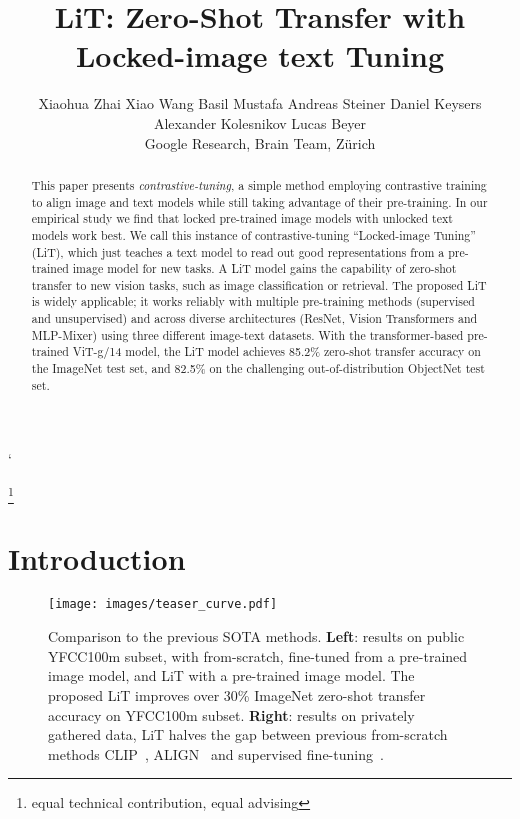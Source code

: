 \documentclass[10pt,twocolumn,letterpaper]{article}
\def \flame {\raisebox{-.1\height}{\texttt{[image: images/Noto\_Emoji\_Pie\_1f525.pdf]}}\xspace}
\def \litf {LiT\flame{}\xspace}
\def \lit {LiT\xspace}
\def\objsota{82.5}
\begin{document}
\lstMakeShortInline`

\title{\litf{}: Zero-Shot Transfer with Locked-image text Tuning}

\newcommand{\authsep}{  }

\author{\normalsize{Xiaohua Zhai \authsep Xiao Wang \authsep Basil Mustafa \authsep Andreas Steiner \authsep Daniel Keysers \authsep Alexander Kolesnikov \authsep Lucas Beyer}\\
Google Research, Brain Team, Zürich}
\maketitle
{\let\thefootnote\relax\footnote{
{equal technical contribution, equal advising}}}

\begin{abstract}

This paper presents \emph{contrastive-tuning}, a simple method employing contrastive training to align image and text models while still taking advantage of their pre-training. In our empirical study we find that locked pre-trained image models with unlocked text models work best. We call this instance of contrastive-tuning “Locked-image Tuning” (\lit{}), which just teaches a text model to read out good representations from a pre-trained image model for new tasks. A \lit{} model gains the capability of zero-shot transfer to new vision tasks, such as image classification or retrieval. The proposed \lit{} is widely applicable; it works reliably with multiple pre-training methods (supervised and unsupervised) and across diverse architectures (ResNet, Vision Transformers and MLP-Mixer) using three different image-text datasets. With the transformer-based pre-trained ViT-g/14 model, the \lit{} model achieves 85.2\% zero-shot transfer accuracy on the ImageNet test set, and \objsota{}\% on the challenging out-of-distribution ObjectNet test set. 
\end{abstract}



\section{Introduction}\label{sec:intro}


\begin{figure}[t]
    \centering
    \texttt{[image: images/teaser\_curve.pdf]}
    \caption{Comparison to the previous SOTA methods. \textbf{Left}: results on public YFCC100m subset, with from-scratch, fine-tuned from a pre-trained image model, and LiT with a pre-trained image model. The proposed LiT improves over 30\% ImageNet zero-shot transfer accuracy on YFCC100m subset.
    \textbf{Right}: results on privately gathered data, LiT halves the gap between previous from-scratch methods CLIP~\cite{clip}, ALIGN~\cite{align} and supervised fine-tuning~\cite{vitg,coatnet}. 
    }
    \label{fig:teaser_curve}
\end{figure}
\end{document}

